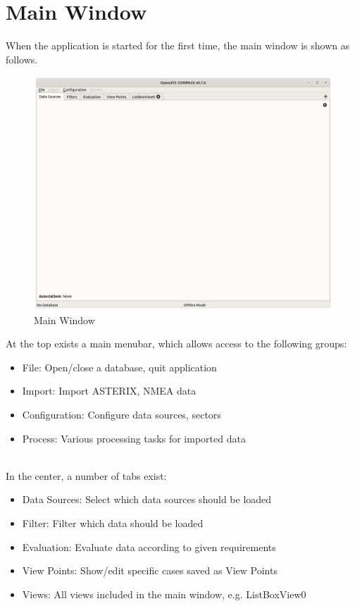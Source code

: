 \section{Main Window}
\label{sec:ui_main_window} 

When the application is started for the first time, the main window is shown as follows. 

\begin{figure}[H]
  \hspace*{-2.5cm}
    \includegraphics[width=19cm]{figures/main_window.png}
  \caption{Main Window}
\end{figure}

At the top exists a main menubar, which allows access to the following groups:

\begin{itemize}
 \item File: Open/close a database, quit application
 \item Import: Import ASTERIX, NMEA data
 \item Configuration: Configure data sources, sectors
 \item Process: Various processing tasks for imported data
\end{itemize}
\  \\

In the center, a number of tabs exist:
\begin{itemize}
 \item Data Sources: Select which data sources should be loaded
 \item Filter: Filter which data should be loaded
 \item Evaluation: Evaluate data according to given requirements
 \item View Points: Show/edit specific cases saved as View Points
 \item Views: All views included in the main window, e.g. ListBoxView0
\end{itemize}
\  \\

